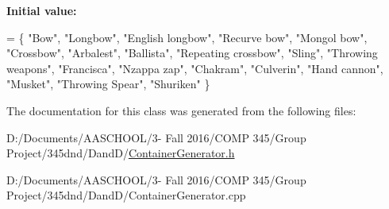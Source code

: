 {\bfseries Initial value\+:}
\begin{DoxyCode}
= \{
    \textcolor{stringliteral}{"Bow"},
    \textcolor{stringliteral}{"Longbow"},
    \textcolor{stringliteral}{"English longbow"},
    \textcolor{stringliteral}{"Recurve bow"},
    \textcolor{stringliteral}{"Mongol bow"},
    \textcolor{stringliteral}{"Crossbow"},
    \textcolor{stringliteral}{"Arbalest"},
    \textcolor{stringliteral}{"Ballista"},
    \textcolor{stringliteral}{"Repeating crossbow"},
    \textcolor{stringliteral}{"Sling"},
    \textcolor{stringliteral}{"Throwing weapons"},
    \textcolor{stringliteral}{"Francisca"},
    \textcolor{stringliteral}{"Nzappa zap"},
    \textcolor{stringliteral}{"Chakram"},
    \textcolor{stringliteral}{"Culverin"},
    \textcolor{stringliteral}{"Hand cannon"},
    \textcolor{stringliteral}{"Musket"},
    \textcolor{stringliteral}{"Throwing Spear"},
    \textcolor{stringliteral}{"Shuriken"}
\}
\end{DoxyCode}


The documentation for this class was generated from the following files\+:\begin{DoxyCompactItemize}
\item 
D\+:/\+Documents/\+A\+A\+S\+C\+H\+O\+O\+L/3-\/ Fall 2016/\+C\+O\+M\+P 345/\+Group Project/345dnd/\+Dand\+D/\hyperlink{_container_generator_8h}{Container\+Generator.\+h}\item 
D\+:/\+Documents/\+A\+A\+S\+C\+H\+O\+O\+L/3-\/ Fall 2016/\+C\+O\+M\+P 345/\+Group Project/345dnd/\+Dand\+D/Container\+Generator.\+cpp\end{DoxyCompactItemize}
